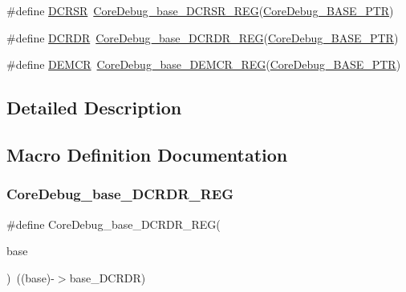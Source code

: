 \begin{DoxyCompactItemize}
\item 
\#define \hyperlink{group___core_debug___register___accessor___macros_gabd5ddab120c0e09c0198d49c25713be3}{D\+C\+R\+SR}~\hyperlink{group___core_debug___register___accessor___macros_ga8b45e5b041ad90bbee03fb1431487fee}{Core\+Debug\+\_\+base\+\_\+\+D\+C\+R\+S\+R\+\_\+\+R\+EG}(\hyperlink{group___core_debug___peripheral_ga994a185afca30ede538d89322c4f0326}{Core\+Debug\+\_\+\+B\+A\+S\+E\+\_\+\+P\+TR})
\item 
\#define \hyperlink{group___core_debug___register___accessor___macros_gaaa7a4f8f79faea1305f3398257c656a0}{D\+C\+R\+DR}~\hyperlink{group___core_debug___register___accessor___macros_ga3ee2f6e86a62ec00d4a06ecf8b320c5e}{Core\+Debug\+\_\+base\+\_\+\+D\+C\+R\+D\+R\+\_\+\+R\+EG}(\hyperlink{group___core_debug___peripheral_ga994a185afca30ede538d89322c4f0326}{Core\+Debug\+\_\+\+B\+A\+S\+E\+\_\+\+P\+TR})
\item 
\#define \hyperlink{group___core_debug___register___accessor___macros_gab6c5b1baf444f12ba50bfc3b0e40e05c}{D\+E\+M\+CR}~\hyperlink{group___core_debug___register___accessor___macros_gaa6db4a530be795b1cc9a41b12e98bb10}{Core\+Debug\+\_\+base\+\_\+\+D\+E\+M\+C\+R\+\_\+\+R\+EG}(\hyperlink{group___core_debug___peripheral_ga994a185afca30ede538d89322c4f0326}{Core\+Debug\+\_\+\+B\+A\+S\+E\+\_\+\+P\+TR})
\end{DoxyCompactItemize}


\subsection{Detailed Description}


\subsection{Macro Definition Documentation}
\mbox{\label{group___core_debug___register___accessor___macros_ga3ee2f6e86a62ec00d4a06ecf8b320c5e}} 
\subsubsection{\texorpdfstring{Core\+Debug\+\_\+base\+\_\+\+D\+C\+R\+D\+R\+\_\+\+R\+EG}{CoreDebug\_base\_DCRDR\_REG}}
{\footnotesize\ttfamily \#define Core\+Debug\+\_\+base\+\_\+\+D\+C\+R\+D\+R\+\_\+\+R\+EG(\begin{DoxyParamCaption}\item[{}]{base }\end{DoxyParamCaption})~((base)-\/$>$base\+\_\+\+D\+C\+R\+DR)}

